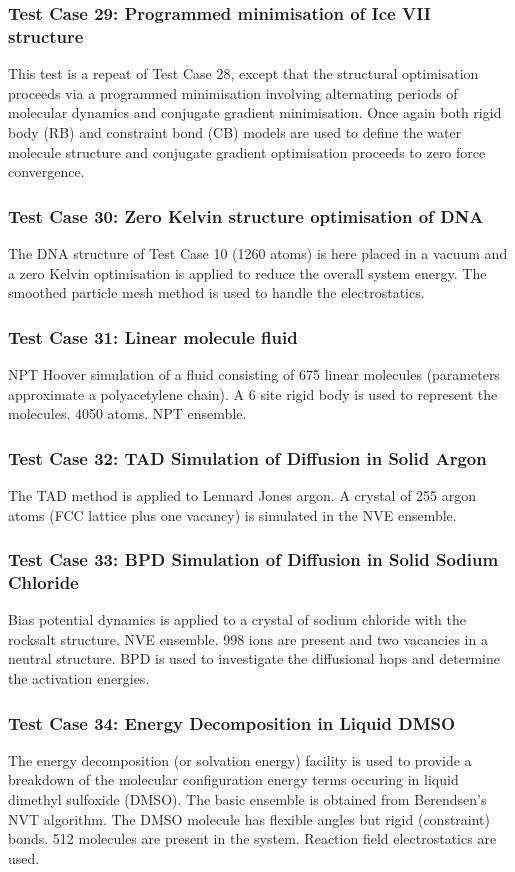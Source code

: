 \subsubsection{Test Case 29: Programmed minimisation of Ice VII
structure}
This test is a repeat of Test Case 28, except that the structural
optimisation proceeds via a programmed minimisation involving
alternating periods of molecular dynamics and conjugate gradient
minimisation. Once again both rigid body (RB) and constraint bond (CB)
models are used to define the water molecule structure and conjugate
gradient optimisation proceeds to zero force convergence.

\subsubsection{Test Case 30: Zero Kelvin structure optimisation of
DNA} 
The DNA structure of Test Case 10 (1260 atoms) is here placed in
a vacuum and a zero Kelvin optimisation is applied to reduce the
overall system energy. The smoothed particle mesh method is used to
handle the electrostatics.

\subsubsection{Test Case 31: Linear molecule fluid}
NPT Hoover simulation of a fluid consisting of 675 linear molecules
(parameters approximate a polyacetylene chain). A 6 site rigid body
is used to represent the molecules. 4050 atoms. NPT ensemble.

\subsubsection{Test Case 32: TAD Simulation of Diffusion in Solid Argon}
The TAD method is applied to Lennard Jones argon. A crystal of 255 argon 
atoms (FCC lattice plus one vacancy) is simulated in the NVE ensemble.

\subsubsection{Test Case 33: BPD Simulation of Diffusion in Solid Sodium Chloride}
Bias potential dynamics is applied to a crystal of sodium chloride with the
rocksalt structure. NVE ensemble. 998 ions are present and two vacancies in a
neutral structure. BPD is used to investigate the diffusional hops and
determine the activation energies.

\subsubsection{Test Case 34: Energy Decomposition in Liquid DMSO}
The energy decomposition (or solvation energy) facility is used to provide a
breakdown of the molecular configuration energy terms occuring in liquid
dimethyl sulfoxide (DMSO). The basic ensemble is obtained from Berendsen's NVT
algorithm. The DMSO molecule has flexible angles but rigid (constraint) bonds.
512 molecules are present in the system. Reaction field electrostatics are used.

